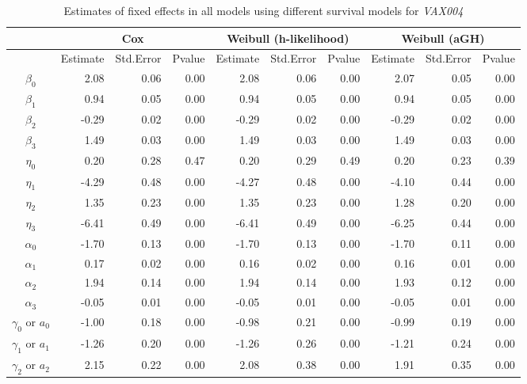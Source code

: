 \begin{table}[ht]
\centering
\caption{Estimates of fixed effects in all models using different survival models for \textit{VAX004}}
\begin{tabular}{c|rrr|rrr|rrr}
  \hline
   &  \multicolumn{3}{c|}{Cox} &  \multicolumn{3}{c|}{Weibull (h-likelihood)} &  \multicolumn{3}{c}{Weibull (aGH)} \\
  \hline
 & Estimate & Std.Error & Pvalue & Estimate & Std.Error & Pvalue & Estimate & Std.Error & Pvalue \\ 
  \hline
  $\beta_0$ & 2.08 & 0.06 & 0.00 & 2.08 & 0.06 & 0.00 & 2.07 & 0.05 & 0.00 \\ 
  $\beta_1$ & 0.94 & 0.05 & 0.00 & 0.94 & 0.05 & 0.00 & 0.94 & 0.05 & 0.00 \\ 
  $\beta_2$ & -0.29 & 0.02 & 0.00 & -0.29 & 0.02 & 0.00 & -0.29 & 0.02 & 0.00 \\ 
  $\beta_3$ & 1.49 & 0.03 & 0.00 & 1.49 & 0.03 & 0.00 & 1.49 & 0.03 & 0.00 \\ 
  
  \hline
  $\eta_0$ & 0.20 & 0.28 & 0.47 & 0.20 & 0.29 & 0.49 & 0.20 & 0.23 & 0.39 \\ 
  $\eta_1$ & -4.29 & 0.48 & 0.00 & -4.27 & 0.48 & 0.00 & -4.10 & 0.44 & 0.00 \\ 
  $\eta_2$ & 1.35 & 0.23 & 0.00 & 1.35 & 0.23 & 0.00 & 1.28 & 0.20 & 0.00 \\ 
  $\eta_3$ & -6.41 & 0.49 & 0.00 & -6.41 & 0.49 & 0.00 & -6.25 & 0.44 & 0.00 \\ 
  \hline
  $\alpha_0$ & -1.70 & 0.13 & 0.00 & -1.70 & 0.13 & 0.00 & -1.70 & 0.11 & 0.00 \\ 
  $\alpha_1$ & 0.17 & 0.02 & 0.00 & 0.16 & 0.02 & 0.00 & 0.16 & 0.01 & 0.00 \\ 
  $\alpha_2$ & 1.94 & 0.14 & 0.00 & 1.94 & 0.14 & 0.00 & 1.93 & 0.12 & 0.00 \\ 
  $\alpha_3$ & -0.05 & 0.01 & 0.00 & -0.05 & 0.01 & 0.00 & -0.05 & 0.01 & 0.00 \\ 
  
  \hline
  $\gamma_0$ or $a_0$ & -1.00 & 0.18 & 0.00 & -0.98 & 0.21 & 0.00 & -0.99 & 0.19 & 0.00 \\ 
  $\gamma_1$ or $a_1$ & -1.26 & 0.20 & 0.00 & -1.26 & 0.26 & 0.00 & -1.21 & 0.24 & 0.00 \\ 
  $\gamma_2$ or $a_2$ & 2.15 & 0.22 & 0.00 & 2.08 & 0.38 & 0.00 & 1.91 & 0.35 & 0.00 \\ 
   \hline
  
\end{tabular}
\label{tbl:applc}
\end{table}
